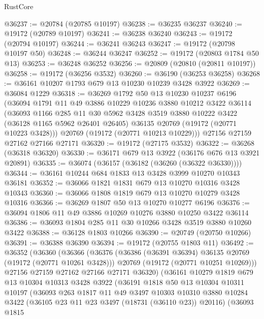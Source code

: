 \begin{lexlean}{RustCore}
\begin{coremodule}
@36237 := @20784 (@20785 @10197)
@36238 := @36235 @36237
@36240 := @19172 (@20789 @10197)
@36241 := @36238 @36240
@36243 := @19172 (@20794 @10197)
@36244 := @36241 @36243
@36247 := @19172 (@20798 @10197 @50)
@36248 := @36244 @36247
@36252 := @19172 (@20803 @1784 @50 @13)
@36253 := @36248 @36252
@36256 := @20809 (@20810 (@20811 @10197))
@36258 := @19172 (@36256 @3532)
@36260 := @36190 (@36253 @36258)
@36268 := @36161 @10207 @1793 @679 @13 @10230 @10239 @3428 @3922
@36269 := @36084 @1229
@36318 := @36269
    @1792
    @50
    @13
    @10230
    @10237
    @6196
    (@36094
      @1791
      @11
      @49
      @3886
      @10229
      @10236
      @3880
      @10212
      @3422
      @36114
      (@36093
        @1166
        @285
        @11
        @30
        @5962
        @3428
        @3519
        @3880
        @10222
        @3422
        (@36128 @1165 @5962 @26401 @26405)
        @36135
        @20769
        (@19172 (@20771 @10223 @3428)))
      @20769
      (@19172 (@20771 @10213 @10229)))
    @27156
    @27159
    @27162
    @27166
    @27171
@36320 := @19172 (@27175 @3532)
@36322 := @36268 (@36318 @36320)
@36330 := @36171 @679 @13 @3922 (@36176 @676 @13 @3921 @20891)
@36335 := @36074 (@36157 (@36182 (@36260 (@36322 @36330))))
@36344 := @36161 @10244 @684 @1833 @13 @3428 @3999 @10270 @10343 @36181
@36352 := @36066 @1821 @1831 @679 @13 @10270 @10316 @3428 @10343
@36360 := @36066 @1808 @1819 @679 @13 @10270 @10279 @3428 @10316
@36366 := @36269 @1807 @50 @13 @10270 @10277 @6196
@36376 := @36094 @1806 @11 @49 @3886 @10269 @10276 @3880 @10250 @3422 @36114
@36386 := @36093 @1804 @285 @11 @30 @10266 @3428 @3519 @3880 @10260 @3422
@36388 := @36128 @1803 @10266
@36390 := @20749 (@20750 @10266)
@36391 := @36388 @36390
@36394 := @19172 (@20755 @1803 @11)
@36492 := @36352
    (@36360
      (@36366
        (@36376
          (@36386 (@36391 @36394) @36135 @20769 (@19172 (@20771 @10261 @3428)))
          @20769
          (@19172 (@20771 @10251 @10269)))
        @27156
        @27159
        @27162
        @27166
        @27171
        @36320)
      (@36161
        @10279
        @1819
        @679
        @13
        @10304
        @10313
        @3428
        @3922
        (@36191
          @1818
          @50
          @13
          @10304
          @10311
          @10197
          (@36093
            @263
            @1817
            @11
            @49
            @3497
            @10303
            @10310
            @3880
            @10284
            @3422
            (@36105 @23 @11 @23 @3497 (@18731 (@36110 @23)) @20116)
            (@36093
              @1815

\end{coremodule}
\end{lexlean}
